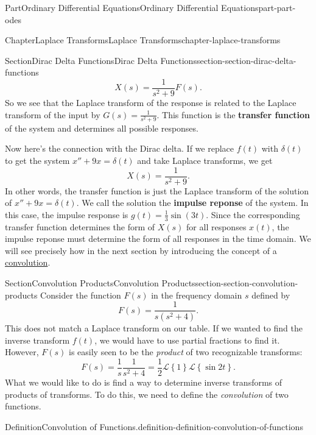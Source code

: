 \documentclass[twoside,10pt,]{book}
\newcommand{\terminology}[1]{\textbf{#1}}
\numberwithin{equation}{part}
\newcommand{\Laplace}[1]{\mathcal{L}\set{#1}}
\newcommand{\set}[1]{\left\{ #1 \right\}}
\begin{document}
\begin{partptx}{Part}{Ordinary Differential Equations}{}{Ordinary Differential Equations}{}{}{part-part-odes}
\begin{chapterptx}{Chapter}{Laplace Transforms}{}{Laplace Transforms}{}{}{chapter-laplace-transforms}
\begin{sectionptx}{Section}{Dirac Delta Functions}{}{Dirac Delta Functions}{}{}{section-section-dirac-delta-functions}
\begin{equation*}
X(s) = \frac{1}{s^2 + 9}F(s)\text{.}
\end{equation*}
So we see that the Laplace transform of the response is related to the Laplace transform of the input by \(G(s) = \frac{1}{s^2 + 9}\). This function is the \terminology{transfer function} of the system and determines all possible responses.%
\par
Now here's the connection with the Dirac delta. If we replace \(f(t)\) with \(\delta(t)\) to get the system \(x'' + 9x = \delta(t)\) and take Laplace transforms, we get%
\begin{equation*}
X(s) = \frac{1}{s^2 + 9}\text{.}
\end{equation*}
In other words, the transfer function is just the Laplace transform of the solution of \(x'' + 9x = \delta(t)\). We call the solution the \terminology{impulse reponse} of the system. In this case, the impulse response is \(g(t) = \frac{1}{3}\sin(3t)\). Since the corresponding transfer function determines the form of \(X(s)\) for all responses \(x(t)\), the impulse reponse must determine the form of all responses in the time domain. We will see precisely how in the next section by introducing the concept of a \hyperref[definition-definition-convolution-of-functions]{convolution}.%
\end{sectionptx}
%
%
\typeout{************************************************}
\typeout{************************************************}
%
\begin{sectionptx}{Section}{Convolution Products}{}{Convolution Products}{}{}{section-section-convolution-products}
Consider the function \(F(s)\) in the frequency domain \(s\) defined by%
\begin{equation*}
F(s) = \frac{1}{s(s^{2}+4)}.
\end{equation*}
This does not match a Laplace transform on our table. If we wanted to find the inverse transform \(f(t)\), we would have to use partial fractions to find it. However, \(F(s)\) is easily seen to be the \emph{product} of two recognizable transforms:%
\begin{equation*}
F(s) = \frac{1}{s} \frac{1}{s^{2}+4} = \frac{1}{2}\Laplace{1}\Laplace{\sin2t}.
\end{equation*}
What we would like to do is find a way to determine inverse transforms of products of transforms. To do this, we need to define the \emph{convolution} of two functions.%
\begin{definition}{Definition}{Convolution of Functions.}{definition-definition-convolution-of-functions}%

\end{definition}
\end{sectionptx}
\end{chapterptx}
\end{partptx}
\end{document}
